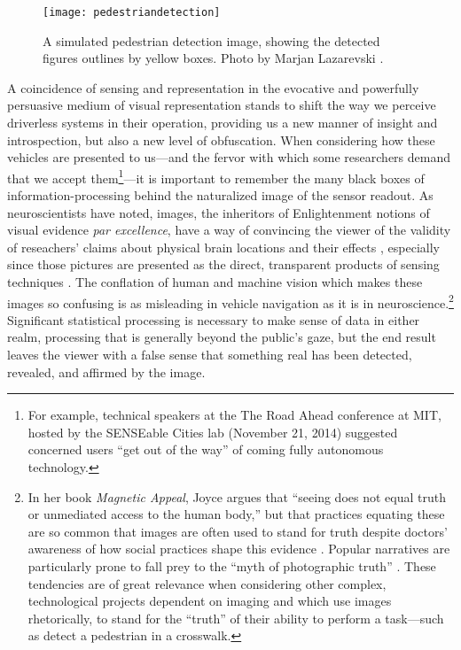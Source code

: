 \begin{figure}[h]
  \begin{center}
  \texttt{[image: pedestriandetection]}
  \end{center}
  \caption{A simulated pedestrian detection image, showing the
    detected figures outlines by yellow boxes. Photo by Marjan Lazarevski  \cite{pedestrianimage}.}
\end{figure}


A coincidence of sensing and representation in the evocative and
powerfully persuasive medium of visual representation stands to shift
the way we perceive driverless systems in their operation, providing
us a new manner of insight and introspection, but also
a new level of obfuscation. When
considering how these vehicles are presented to us---and the fervor with
which some researchers demand that we accept them\footnote{For
  example, technical speakers at the The Road Ahead conference at MIT,
hosted by the SENSEable Cities lab (November 21, 2014) suggested
concerned users ``get out of the way'' of coming fully autonomous
technology.}---it is important to 
remember the many black boxes of information-processing behind the
naturalized image of the sensor readout. As neuroscientists have
noted, images, the inheritors of Enlightenment notions of
visual evidence \emph{par excellence}, have a way of convincing the viewer of
the validity of reseachers' claims about physical brain locations and
their effects \cite{lehrerNeuro}, especially since those pictures are presented as the
direct, transparent products of sensing techniques \cite[p.
  76]{kellyMagnetic}. The conflation of 
human and machine vision which makes these images so confusing is as
misleading in vehicle navigation as it is in neuroscience.\footnote{In
her book \emph{Magnetic Appeal}, Joyce argues that ``seeing does not
equal truth or unmediated access to the human body,'' but that
practices equating these are so common that images are often used to
stand for truth despite doctors' awareness of how social practices
shape this evidence
\cite[p. 76]{kellyMagnetic}. Popular narratives are particularly prone
to fall
prey to the ``myth of photographic truth'' \cite[p.
  75]{kellyMagnetic}. These tendencies are of great relevance
when considering other complex, technological projects dependent on
imaging and which use images rhetorically, to stand for the ``truth''
of their ability to perform a task---such as detect a pedestrian in a
crosswalk.} Significant 
statistical processing is necessary to make sense of data in either
realm, processing that is generally beyond the public's gaze, but the 
end result leaves the viewer with a false sense that something real
has been detected, revealed, and affirmed by the image.


